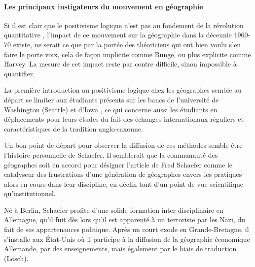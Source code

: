 

\paragraph{Les principaux instigateurs du mouvement en géographie}

Si il est clair que le positivisme logique n'est pas au fondement de la révolution quantitative \autocite{Claval2003}, l'impact de ce mouvement sur la géographie dans la décennie 1960-70 existe, ne serait ce que par la portée des théoriciens qui ont bien voulu s'en faire le porte voix, cela de façon implicite comme Bunge, ou plus  explicite comme Harvey. La mesure de cet impact reste par contre difficile, sinon impossible à quantifier.

La première introduction au positivisme logique chez les géographes semble au départ se limiter aux étudiants présents sur les bancs de l'université de Washington (Seattle) et d'Iowa \autocite[554]{Barnes2001a} \autocite[120-121]{Unwin1992}, ce qui concerne aussi les étudiants en déplacements pour leurs études du fait des échanges internationaux réguliers et caractéristiques de la tradition anglo-saxonne.

Un bon point de départ pour observer la diffusion de ces méthodes semble être l'histoire personnelle de Schaefer. Il semblerait que la communauté des géographes soit en accord \autocite[15]{Louail2010} pour désigner l'article de Fred Schaefer \autocite{Schaefer1953} comme le catalyseur des frustrations d'une génération de géographes envers les pratiques alors en cours dans leur discipline, en déclin tant d'un point de vue scientifique qu’institutionnel.

Né à Berlin, Schaefer profite d'une solide formation inter-disciplinaire en Allemagne, qu'il fuit dès lors qu'il est apparenté à un terroriste par les Nazi, du fait de ses appartenances politique. Après un court exode en Grande-Bretagne, il s'installe aux État-Unis où il participe à la diffusion de la géographie économique Allemande, par des enseignements, mais également par le biais de traduction (Lösch). \autocite{Bunge1979}

